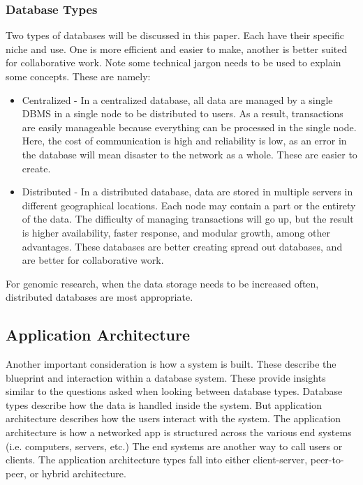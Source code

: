 \documentclass[acmsmall]{acmart}
\begin{document}
\subsubsection{Database Types} 
Two types of databases will be discussed in this paper. Each have their specific niche and use. One is more efficient and easier to make, another is better suited for collaborative work. Note some technical jargon needs to be used to explain some concepts. These are namely: \cite{centralizedvsdistributed}

\begin{itemize}
    \item Centralized - In a centralized database, all data are managed by a single DBMS in a single node to be distributed to users. As a result, transactions are easily manageable because everything can be processed in the single node. Here, the cost of communication is high and reliability is low, as an error in the database will mean disaster to the network as a whole. These are easier to create.
    
    \item Distributed - In a distributed database, data are stored in multiple servers in different geographical locations. Each node may contain a part or the entirety of the data. The difficulty of managing transactions will go up, but the result is higher availability, faster response, and modular growth, among other advantages. These databases are better creating spread out databases, and are better for collaborative work.
\end{itemize}

For genomic research, when the data storage needs to be increased often, distributed databases are most appropriate.

\subsection{Application Architecture}
Another important consideration is how a system is built. These describe the blueprint and interaction within a database system. These provide insights similar to the questions asked when looking between database types. Database types describe how the data is handled inside the system. But application architecture describes how the users interact with the system. The application architecture is how a networked app is structured across the various end systems (i.e. computers, servers, etc.) \cite{kurose} The end systems are another way to call users or clients. 
The application architecture types fall into either client-server, peer-to-peer, or hybrid architecture.
\end{document}
